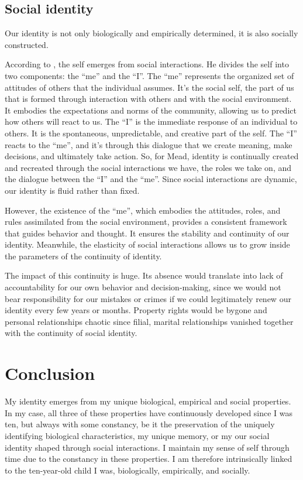 \documentclass[a4paper,english,12pt]{scrartcl}
\begin{document}
\subsection{Social identity}

Our identity is not only biologically and empirically
determined, it is also socially constructed.

According to \textcite{Mead1934MindSA}, the self emerges from social
interactions. He divides the self into two components: the ``me''
and the ``I''. The ``me'' represents the organized set of attitudes
of others that the individual assumes. It's the social self, the part
of us that is formed through interaction with others and with the
social environment. It embodies the expectations and norms of the
community, allowing us to predict how others will react to us. The
``I'' is the immediate response of an individual to others. It is
the spontaneous, unpredictable, and creative part of the self. The
``I'' reacts to the ``me'', and it's through this dialogue that
we create meaning, make decisions, and ultimately take action. So,
for Mead, identity is continually created and recreated through the
social interactions we have, the roles we take on, and the dialogue
between the ``I'' and the ``me''. Since social interactions are
dynamic, our identity is fluid rather than fixed.

However, the existence of the ``me'', which embodies the attitudes,
roles, and rules assimilated from the social environment, provides
a consistent framework that guides behavior and thought. It ensures
the stability and continuity of our identity. Meanwhile, the elasticity
of social interactions allows us to grow inside the parameters of
the continuity of identity.

The impact of this continuity is huge. Its absence would translate
into lack of accountability for our own behavior and decision-making,
since we would not bear responsibility for our mistakes or crimes
if we could legitimately renew our identity every few years or
months. Property rights would be bygone and personal relationships chaotic
since filial, marital relationships vanished together with the continuity
of social identity.

\section{Conclusion}

My identity emerges from my unique biological, empirical and social
properties. In my case, all three of these properties have continuously
developed since I was ten, but always with some constancy, be it the
preservation of the uniquely identifying biological characteristics,
my unique memory, or my our
social identity shaped through social interactions. I maintain my
sense of self through time due to the constancy in these properties.
I am therefore intrinsically linked to the ten-year-old child I was,
biologically, empirically, and socially.

\printbibliography

\doclicenseThis
\end{document}
